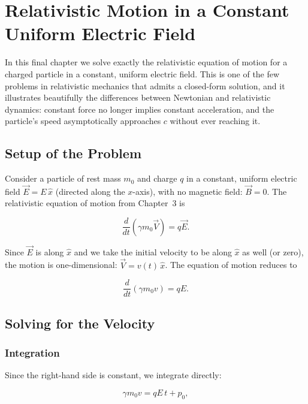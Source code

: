 \chapter{Relativistic Motion in a Constant Uniform Electric Field}

In this final chapter we solve exactly the relativistic equation of motion for a charged particle in a constant, uniform electric field. This is one of the few problems in relativistic mechanics that admits a closed-form solution, and it illustrates beautifully the differences between Newtonian and relativistic dynamics: constant force no longer implies constant acceleration, and the particle's speed asymptotically approaches $c$ without ever reaching it.

\section{Setup of the Problem}

Consider a particle of rest mass $m_0$ and charge $q$ in a constant, uniform electric field $\vec{E} = E\,\hat{x}$ (directed along the $x$-axis), with no magnetic field: $\vec{B} = 0$. The relativistic equation of motion from Chapter~3 is

\begin{equation}
\frac{d}{dt}\!\left(\gamma m_0 \vec{V}\right) = q\vec{E}.
\end{equation}

Since $\vec{E}$ is along $\hat{x}$ and we take the initial velocity to be along $\hat{x}$ as well (or zero), the motion is one-dimensional: $\vec{V} = v(t)\,\hat{x}$. The equation of motion reduces to

\begin{equation}
\frac{d}{dt}\!\left(\gamma m_0 v\right) = qE.
\end{equation}

\section{Solving for the Velocity}

\subsection{Integration}

Since the right-hand side is constant, we integrate directly:

\begin{equation}
\gamma m_0 v = qE\,t + p_0,
\end{equation}

